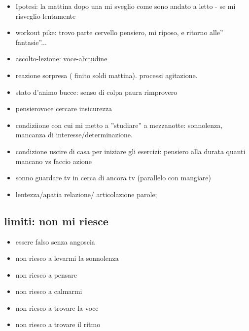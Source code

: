 \begin{itemize}

\item Ipotesi: la mattina dopo una  mi sveglio come sono andato a letto - se  mi risveglio lentamente

\item workout pike: trovo parte cervello pensiero, mi riposo, e ritorno alle'' fantasie''...

\item ascolto-lezione: voce-abitudine

\item reazione sorpresa ( finito soldi mattina). processi agitazione.

\item stato d'animo bucce: senso di colpa paura rimprovero

\item pensierovoce cercare insicurezza

\item condiziione con cui  mi metto a ''studiare'' a mezzanotte: sonnolenza, mancanza di interesse/determinazione.


\item condizione uscire di casa per iniziare gli esercizi: pensiero alla durata quanti mancano vs faccio azione

\item sonno guardare tv in cerca di ancora tv (parallelo con mangiare)

\item lentezza/apatia relazione/ articolazione parole;

\end{itemize}

\subsection{limiti: non mi riesce}

\begin{itemize}

\item essere falso senza angoscia

\item non riesco a levarmi la sonnolenza

\item non riesco a pensare

\item non riesco a calmarmi

\item non riesco a trovare la voce

\item non riesco a trovare il ritmo

\end{itemize}

